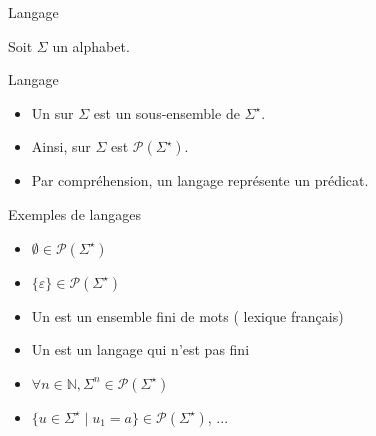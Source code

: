 
\begingroup

\begin{frame}{Langage}

  Soit $\Sigma$ un alphabet.

  \begin{block}{Langage}
    \begin{itemize}
    \item Un  sur $\Sigma$ est un sous-ensemble de $\Sigma^\star$.
    \item Ainsi,  sur $\Sigma$ est \alert{$\mathscr{P}(\Sigma^\star)$}.
    \item Par compréhension, un langage représente un prédicat.
    \end{itemize}
  \end{block}

  \begin{exampleblock}{Exemples de langages}
    \begin{itemize}
    \item {} $\emptyset \in \mathscr{P}(\Sigma^\star)$
    \item {} $\{\varepsilon\} \in \mathscr{P}(\Sigma^\star)$
    \item Un  est un ensemble fini de mots ( lexique français)
    \item Un  est un langage qui n'est pas fini
    \item $\forall n\in \mathbb{N}, \Sigma^n \in \mathscr{P}(\Sigma^\star)$
    \item $\{ u \in \Sigma^\star \mid u_1 = a\} \in \mathscr{P}(\Sigma^\star)$, ...
    \end{itemize}

  \end{exampleblock}

\end{frame}

\endgroup
\endinput
